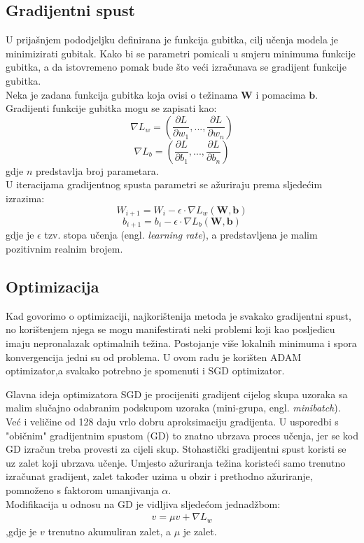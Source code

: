 \documentclass[times, utf8, zavrsni, numeric]{fer}
\begin{document}
\subsection{Gradijentni spust}
U prijašnjem pododjeljku definirana je funkcija gubitka, cilj učenja modela je minimizirati gubitak. Kako bi se parametri pomicali u smjeru minimuma funkcije gubitka, a da istovremeno pomak bude što veći izračunava se gradijent funkcije gubitka. \\
Neka je zadana funkcija gubitka koja ovisi o težinama $\textbf{W}$ i pomacima $\textbf{b}$. Gradijenti funkcije gubitka mogu se zapisati kao:
\begin{equation}
\nabla L_{w} = \left(\frac{\partial L}{\partial w_{1}},...,\frac{\partial L}{\partial w_{n}} \right)
\label{eq:Aktivacija}
\end{equation}
\begin{equation}
\nabla L_{b} = \left(\frac{\partial L}{\partial b_{1}},...,\frac{\partial L}{\partial b_{n}} \right)
\label{eq:Aktivacija}
\end{equation}
gdje $n$ predstavlja broj parametara.\\
U iteracijama gradijentnog spusta parametri se ažuriraju prema sljedećim izrazima:
\begin{equation}
W_{i+1} = W_{i} - \epsilon \cdot \nabla L_{w}(\textbf{W},\textbf{b})
\label{eq:Aktivacija}
\end{equation}
\begin{equation}
b_{i+1} = b_{i} - \epsilon \cdot \nabla L_{b}(\textbf{W},\textbf{b})
\label{eq:Aktivacija}
\end{equation}
gdje je $\epsilon$ tzv. stopa učenja (engl. \textit{learning rate}), a predstavljena je malim pozitivnim realnim brojem.\cite{duboko} \pagebreak
\subsection{Optimizacija}
Kad govorimo o optimizaciji, najkorištenija metoda je svakako gradijentni spust, no korištenjem njega se mogu manifestirati neki problemi koji kao posljedicu imaju nepronalazak optimalnih težina. Postojanje više lokalnih minimuma i spora konvergencija jedni su od problema. 
U ovom radu je korišten ADAM optimizator,a svakako potrebno je spomenuti i SGD optimizator. 

Glavna ideja optimizatora SGD je procijeniti gradijent cijelog skupa uzoraka sa malim slučajno odabranim podskupom uzoraka (mini-grupa, engl. \textit{minibatch}). Već i veličine od 128 daju vrlo dobru aproksimaciju gradijenta. U usporedbi s "običnim" gradijentnim spustom (GD) to znatno ubrzava proces učenja, jer se kod GD izračun treba provesti za cijeli skup. Stohastički gradijentni spust koristi se uz zalet koji ubrzava učenje. Umjesto ažuriranja težina koristeći samo trenutno izračunat gradijent, zalet također uzima u obzir i prethodno ažuriranje, pomnoženo s faktorom umanjivanja $\alpha$.\cite{sgd}\\ 
Modifikacija u odnosu na GD je vidljiva sljedećom jednadžbom:
\begin{align}
v = \mu v + \nabla L_{w}
\end{align}
,gdje je $v$ trenutno akumuliran zalet, a $\mu$ je zalet.
\end{document}
